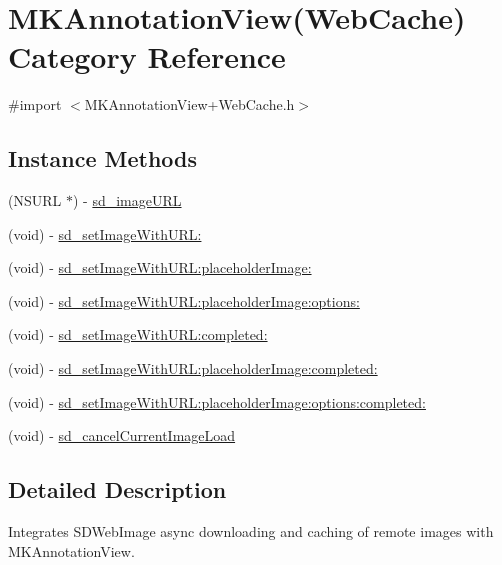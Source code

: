 \hypertarget{category_m_k_annotation_view_07_web_cache_08}{}\section{M\+K\+Annotation\+View(Web\+Cache) Category Reference}
\label{category_m_k_annotation_view_07_web_cache_08}


{\ttfamily \#import $<$M\+K\+Annotation\+View+\+Web\+Cache.\+h$>$}

\subsection*{Instance Methods}
\begin{DoxyCompactItemize}
\item 
(N\+S\+U\+R\+L $\ast$) -\/ \hyperlink{category_m_k_annotation_view_07_web_cache_08_a74c24e476d923350750b68540e16db00}{sd\+\_\+image\+U\+R\+L}
\item 
(void) -\/ \hyperlink{category_m_k_annotation_view_07_web_cache_08_abf0bbcd1304975798be85f9c96ef1ab1}{sd\+\_\+set\+Image\+With\+U\+R\+L\+:}
\item 
(void) -\/ \hyperlink{category_m_k_annotation_view_07_web_cache_08_a6cf4745e0d3f7956762fa7746b6c5a34}{sd\+\_\+set\+Image\+With\+U\+R\+L\+:placeholder\+Image\+:}
\item 
(void) -\/ \hyperlink{category_m_k_annotation_view_07_web_cache_08_afc24de256d5e42fcf07f541c6444749b}{sd\+\_\+set\+Image\+With\+U\+R\+L\+:placeholder\+Image\+:options\+:}
\item 
(void) -\/ \hyperlink{category_m_k_annotation_view_07_web_cache_08_a68cafc6706e429b3e640c3031b4453fd}{sd\+\_\+set\+Image\+With\+U\+R\+L\+:completed\+:}
\item 
(void) -\/ \hyperlink{category_m_k_annotation_view_07_web_cache_08_a1f081e7080567f6cc3acbf4e45497a87}{sd\+\_\+set\+Image\+With\+U\+R\+L\+:placeholder\+Image\+:completed\+:}
\item 
(void) -\/ \hyperlink{category_m_k_annotation_view_07_web_cache_08_a20ba068d86aecbd9a3cb8f3512ef2b92}{sd\+\_\+set\+Image\+With\+U\+R\+L\+:placeholder\+Image\+:options\+:completed\+:}
\item 
(void) -\/ \hyperlink{category_m_k_annotation_view_07_web_cache_08_af7e8fcf3f05b40d97da6208ef5c4307b}{sd\+\_\+cancel\+Current\+Image\+Load}
\end{DoxyCompactItemize}


\subsection{Detailed Description}
Integrates S\+D\+Web\+Image async downloading and caching of remote images with M\+K\+Annotation\+View. 

